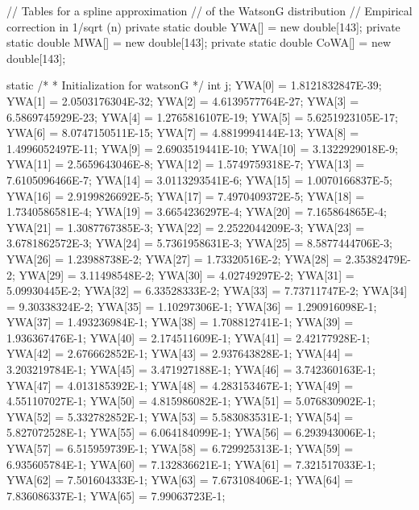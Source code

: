 \begin{code}\begin{hide}
   // Tables for a spline approximation
   // of the WatsonG distribution
   // Empirical correction in 1/sqrt (n)
   private static double YWA[] = new double[143];
   private static double MWA[] = new double[143];
   private static double CoWA[] = new double[143];

   static {
   /*
    * Initialization for watsonG
    */
      int j;
      YWA[0] = 1.8121832847E-39;
      YWA[1] = 2.0503176304E-32;
      YWA[2] = 4.6139577764E-27;
      YWA[3] = 6.5869745929E-23;
      YWA[4] = 1.2765816107E-19;
      YWA[5] = 5.6251923105E-17;
      YWA[6] = 8.0747150511E-15;
      YWA[7] = 4.8819994144E-13;
      YWA[8] = 1.4996052497E-11;
      YWA[9] = 2.6903519441E-10;
      YWA[10] = 3.1322929018E-9;
      YWA[11] = 2.5659643046E-8;
      YWA[12] = 1.5749759318E-7;
      YWA[13] = 7.6105096466E-7;
      YWA[14] = 3.0113293541E-6;
      YWA[15] = 1.0070166837E-5;
      YWA[16] = 2.9199826692E-5;
      YWA[17] = 7.4970409372E-5;
      YWA[18] = 1.7340586581E-4;
      YWA[19] = 3.6654236297E-4;
      YWA[20] = 7.165864865E-4;
      YWA[21] = 1.3087767385E-3;
      YWA[22] = 2.2522044209E-3;
      YWA[23] = 3.6781862572E-3;
      YWA[24] = 5.7361958631E-3;
      YWA[25] = 8.5877444706E-3;
      YWA[26] = 1.23988738E-2;
      YWA[27] = 1.73320516E-2;
      YWA[28] = 2.35382479E-2;
      YWA[29] = 3.11498548E-2;
      YWA[30] = 4.02749297E-2;
      YWA[31] = 5.09930445E-2;
      YWA[32] = 6.33528333E-2;
      YWA[33] = 7.73711747E-2;
      YWA[34] = 9.30338324E-2;
      YWA[35] = 1.10297306E-1;
      YWA[36] = 1.290916098E-1;
      YWA[37] = 1.493236984E-1;
      YWA[38] = 1.708812741E-1;
      YWA[39] = 1.936367476E-1;
      YWA[40] = 2.174511609E-1;
      YWA[41] = 2.42177928E-1;
      YWA[42] = 2.676662852E-1;
      YWA[43] = 2.937643828E-1;
      YWA[44] = 3.203219784E-1;
      YWA[45] = 3.471927188E-1;
      YWA[46] = 3.742360163E-1;
      YWA[47] = 4.013185392E-1;
      YWA[48] = 4.283153467E-1;
      YWA[49] = 4.551107027E-1;
      YWA[50] = 4.815986082E-1;
      YWA[51] = 5.076830902E-1;
      YWA[52] = 5.332782852E-1;
      YWA[53] = 5.583083531E-1;
      YWA[54] = 5.827072528E-1;
      YWA[55] = 6.064184099E-1;
      YWA[56] = 6.293943006E-1;
      YWA[57] = 6.515959739E-1;
      YWA[58] = 6.729925313E-1;
      YWA[59] = 6.935605784E-1;
      YWA[60] = 7.132836621E-1;
      YWA[61] = 7.321517033E-1;
      YWA[62] = 7.501604333E-1;
      YWA[63] = 7.673108406E-1;
      YWA[64] = 7.836086337E-1;
      YWA[65] = 7.99063723E-1;
}
\end{hide}
\end{code}
